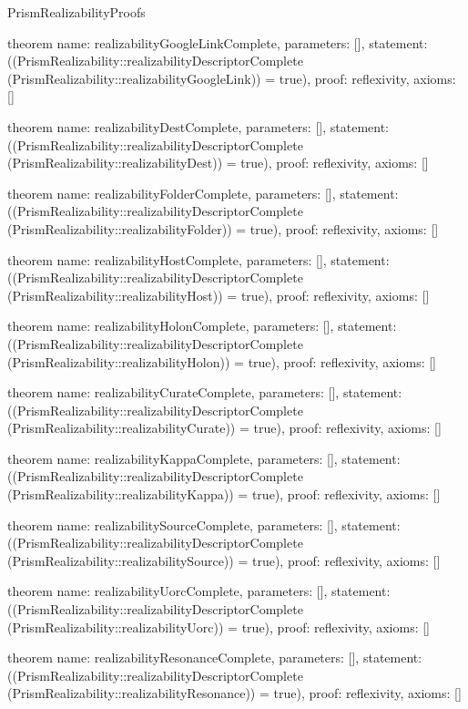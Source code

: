 \begin{lexlean}{PrismRealizabilityProofs}
\begin{semanticmodule}
theorem{
  name: realizabilityGoogleLinkComplete,
  parameters: [],
  statement: ((PrismRealizability::realizabilityDescriptorComplete (PrismRealizability::realizabilityGoogleLink)) = true),
  proof: reflexivity{},
  axioms: []
}

theorem{
  name: realizabilityDestComplete,
  parameters: [],
  statement: ((PrismRealizability::realizabilityDescriptorComplete (PrismRealizability::realizabilityDest)) = true),
  proof: reflexivity{},
  axioms: []
}

theorem{
  name: realizabilityFolderComplete,
  parameters: [],
  statement: ((PrismRealizability::realizabilityDescriptorComplete (PrismRealizability::realizabilityFolder)) = true),
  proof: reflexivity{},
  axioms: []
}

theorem{
  name: realizabilityHostComplete,
  parameters: [],
  statement: ((PrismRealizability::realizabilityDescriptorComplete (PrismRealizability::realizabilityHost)) = true),
  proof: reflexivity{},
  axioms: []
}

theorem{
  name: realizabilityHolonComplete,
  parameters: [],
  statement: ((PrismRealizability::realizabilityDescriptorComplete (PrismRealizability::realizabilityHolon)) = true),
  proof: reflexivity{},
  axioms: []
}

theorem{
  name: realizabilityCurateComplete,
  parameters: [],
  statement: ((PrismRealizability::realizabilityDescriptorComplete (PrismRealizability::realizabilityCurate)) = true),
  proof: reflexivity{},
  axioms: []
}

theorem{
  name: realizabilityKappaComplete,
  parameters: [],
  statement: ((PrismRealizability::realizabilityDescriptorComplete (PrismRealizability::realizabilityKappa)) = true),
  proof: reflexivity{},
  axioms: []
}

theorem{
  name: realizabilitySourceComplete,
  parameters: [],
  statement: ((PrismRealizability::realizabilityDescriptorComplete (PrismRealizability::realizabilitySource)) = true),
  proof: reflexivity{},
  axioms: []
}

theorem{
  name: realizabilityUorcComplete,
  parameters: [],
  statement: ((PrismRealizability::realizabilityDescriptorComplete (PrismRealizability::realizabilityUorc)) = true),
  proof: reflexivity{},
  axioms: []
}

theorem{
  name: realizabilityResonanceComplete,
  parameters: [],
  statement: ((PrismRealizability::realizabilityDescriptorComplete (PrismRealizability::realizabilityResonance)) = true),
  proof: reflexivity{},
  axioms: []
}


\end{semanticmodule}
\end{lexlean}
